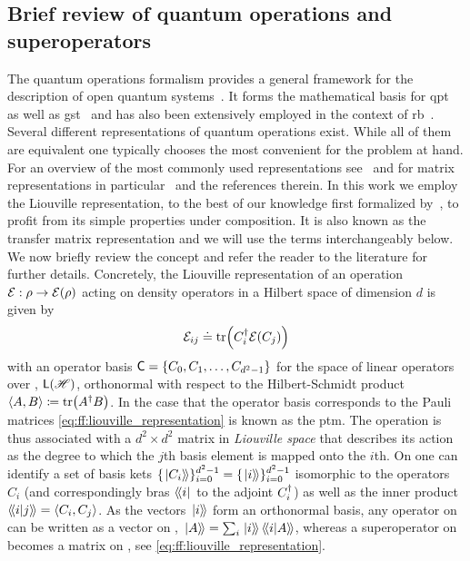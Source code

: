 \subsection{Brief review of quantum operations and superoperators}\label{subsec:ff:theory:quantum_operations}
The quantum operations formalism provides a general framework for the description of open quantum systems~\cite{Kraus1983,Nielsen2011}.
It forms the mathematical basis for \gls{qpt}~\cite{Chuang1997,Poyatos1997} as well as \gls{gst}~\cite{Blume-Kohout2013,Greenbaum2015} and has also been extensively employed in the context of \gls{rb}~\cite{Magesan2011,Kimmel2014}.
Several different representations of quantum operations exist.
While all of them are equivalent one typically chooses the most convenient for the problem at hand.
For an overview of the most commonly used representations see~ and for matrix representations in particular~ and the references therein.
In this work we employ the Liouville representation, to the best of our knowledge first formalized by~\citet{Fano1957}, to profit from its simple properties under composition.
It is also known as the transfer matrix representation and we will use the terms interchangeably below.
We now briefly review the concept and refer the reader to the literature for further details.
Concretely, the Liouville representation of an operation $\mathcal{E}: \rho\rightarrow\mathcal{E}(\rho)$ acting on density operators in a Hilbert space \Hspace of dimension $d$ is given by
\begin{equation}\label{eq:ff:liouville_representation}
    \mathcal{E}_{ij}\doteq\tr(C_i^\dagger\mathcal{E}(C_j))
\end{equation}
with an operator basis $\mathsf{C}=\lbrace C_0, C_1, \dotsc, C_{d^2-1}\rbrace$ for the space of linear operators over \Hspace, $\mathsf{L}(\mathscr{H})$, orthonormal with respect to the Hilbert-Schmidt product $\expval{A,B}\coloneqq\tr(A^\dagger B)$.
In the case that the operator basis corresponds to the Pauli matrices \cref{eq:ff:liouville_representation} is known as the \gls{ptm}.
The operation \qp is thus associated with a $d^2\times d^2$ matrix in \emph{Liouville space} \Lspace that describes its action as the degree to which the $j$th basis element is mapped onto the $i$th.
On \Lspace one can identify a set of basis kets $\lbrace\dket{C_i}\rbrace_{i=0}^{d^2-1} = \lbrace\dket{i}\rbrace_{i=0}^{d^2-1}$ isomorphic to the operators $C_i$ (and correspondingly bras $\dbra{i}$ to the adjoint $C_i^\dagger$) as well as the inner product $\dip{i}{j} = \dotHS{C_i}{C_j}$.
As the vectors $\dket{i}$ form an orthonormal basis, any operator on \Hspace can be written as a vector on \Lspace, $\dket{A} = \sum_i\dket{i}\dip{i}{A}$, whereas a superoperator on \Hspace becomes a matrix on \Lspace, see \cref{eq:ff:liouville_representation}.
